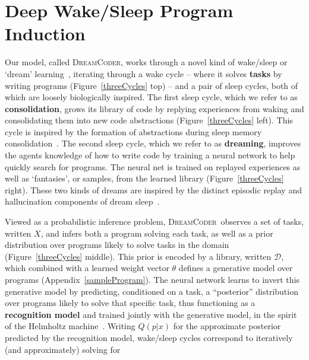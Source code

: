 \documentclass{article}
\newcommand{\system}{\textsc{DreamCoder}~}
\newcommand{\systemEnding}{\textsc{DreamCoder}}
\begin{document}



\section{Deep Wake/Sleep Program Induction}\label{overviewSection}

Our model, called \systemEnding, works through a novel kind
of wake/sleep or `dream' learning~\cite{hinton1995wake}, iterating
through a wake cycle -- where it solves \textbf{tasks} by writing programs (Figure~\ref{threeCycles} top)
-- and a pair of sleep cycles, both of which are loosely biologically
inspired. The first sleep cycle, which we refer to as
\textbf{consolidation}, grows its library of code by replying
experiences from waking and consolidating them into new code
abstractions (Figure~\ref{threeCycles} left).  This cycle is inspired by the formation of abstractions
during sleep memory consolidation~\cite{DUDAI201520}.  The second
sleep cycle, which we refer to as \textbf{dreaming}, improves the
agents knowledge of how to write code by training a neural network to
help quickly search for programs. The neural net is trained on replayed
experiences as well as `fantasies', or samples, from the learned
library (Figure~\ref{threeCycles} right).  These two kinds of dreams are inspired by the distinct
episodic replay and hallucination components of dream
sleep~\cite{fosse2003dreaming}.

Viewed as a probabilistic inference problem, \system observes a set of
tasks, written $X$, and infers both a program solving each task, as
well as a prior distribution over programs likely to solve tasks in
the domain (Figure~\ref{threeCycles} middle). This prior is encoded by
a library, written $\mathcal{D}$, which combined with a
learned weight vector $\theta$
defines a generative model over programs
(Appendix~\ref{sampleProgram}).  The neural network learns to invert
this generative model by predicting, conditioned on a task, a
``posterior'' distribution over programs likely to solve that specific
task,
thus functioning as a \textbf{recognition model} and trained jointly with the generative model, in the spirit of the Helmholtz machine~\cite{hinton1995wake}.
Writing $Q(p|x)$ for the approximate
posterior predicted by the recognition model, wake/sleep cycles correspond to iteratively (and
approximately) solving for
\end{document}
